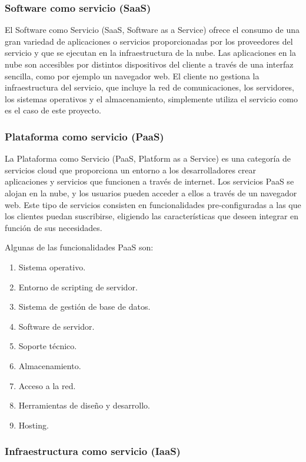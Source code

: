 \documentclass[a4paper,11pt]{book}
\begin{document}
\subsubsection{Software como servicio (SaaS)}\label{secsaas}

El Software como Servicio\cite{saas} (SaaS, Software as a Service) ofrece el consumo de una gran variedad de aplicaciones o servicios proporcionadas por los proveedores del servicio y que se ejecutan en la infraestructura de la nube. Las aplicaciones en la nube son accesibles por distintos dispositivos del cliente a través de una interfaz sencilla, como por ejemplo un navegador web. El cliente no gestiona la infraestructura del servicio, que incluye la red de comunicaciones, los servidores, los sistemas operativos y el almacenamiento, simplemente utiliza el servicio como es el caso de este proyecto.

\subsubsection{Plataforma como servicio (PaaS)}\label{secpaas}

La Plataforma como Servicio\cite{paas} (PaaS, Platform as a Service) es una categoría de servicios cloud que proporciona un entorno a los desarrolladores crear aplicaciones y servicios que funcionen a través de internet. Los servicios PaaS se alojan en la nube, y los usuarios pueden acceder a ellos a través de un navegador web. Este tipo de servicios consisten en funcionalidades pre-configuradas a las que los clientes puedan suscribirse, eligiendo las características que deseen integrar en función de sus necesidades.

Algunas de las funcionalidades PaaS son:

\begin{enumerate}
\item Sistema operativo.
\item Entorno de scripting de servidor.
\item Sistema de gestión de base de datos.
\item Software de servidor.
\item Soporte técnico.
\item Almacenamiento.
\item Acceso a la red.
\item Herramientas de diseño y desarrollo.
\item Hosting.
\end{enumerate}

\subsubsection{Infraestructura como servicio (IaaS)}
\end{document}
